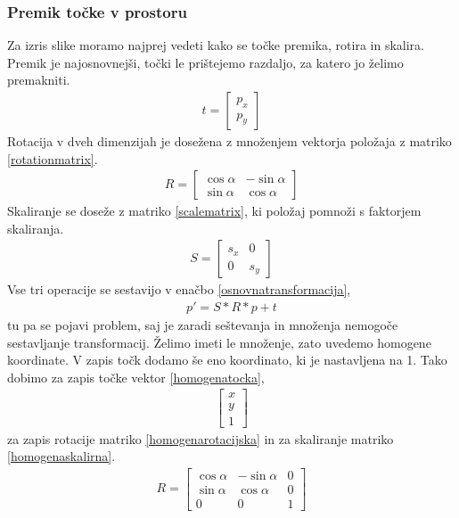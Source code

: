 \documentclass[a4paper, 12pt]{book}
\begin{document}
\subsubsection*{Premik točke v prostoru}

Za izris slike moramo najprej vedeti kako se točke premika, rotira in skalira. Premik je najosnovnejši, točki le prištejemo razdaljo, za katero jo želimo premakniti. 
\begin{align}
t
=
\begin{bmatrix}
p_x \\
p_y
\end{bmatrix}
\label{rotationmatrix}
\end{align}
Rotacija v dveh dimenzijah je dosežena z množenjem vektorja položaja z matriko \ref{rotationmatrix}.
\begin{align}
R
=
\begin{bmatrix}
\cos\alpha & -\sin\alpha \\
\sin\alpha & \cos\alpha
\end{bmatrix}
\label{rotationmatrix}
\end{align}
Skaliranje se doseže z matriko \ref{scalematrix}, ki položaj pomnoži s faktorjem skaliranja.
\begin{align}
S
=
\begin{bmatrix}
s_x & 0 \\
0 & s_y
\end{bmatrix}
\label{scalematrix}
\end{align}
Vse tri operacije se sestavijo v enačbo \ref{osnovnatransformacija},
\begin{align}
p'
=
S*R*p+t
\label{osnovnatransformacija}
\end{align}
tu pa se pojavi problem, saj je zaradi seštevanja in množenja nemogoče sestavljanje transformacij. Želimo imeti le množenje, zato uvedemo homogene koordinate. V zapis točk dodamo še eno koordinato, ki je nastavljena na 1. Tako dobimo za zapis točke vektor \ref{homogenatocka},
\begin{align}
\begin{bmatrix}
x \\ y \\ 1
\end{bmatrix}
\label{homogenatocka}
\end{align}
za zapis rotacije matriko \ref{homogenarotacijska} in za skaliranje matriko \ref{homogenaskalirna}.
\begin{align}
R
=
\begin{bmatrix}
\cos\alpha & -\sin\alpha & 0 \\
\sin\alpha & \cos\alpha & 0 \\
0 & 0 & 1
\end{bmatrix}
\label{homogenarotacijska}
\end{align}
\end{document}
